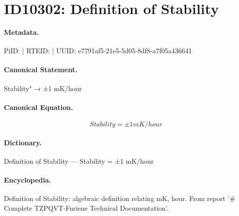\section*{ID10302: Definition of Stability}
\paragraph{Metadata.}
PiID:  | RTEID:  | UUID: e7791af5-21e5-5d05-8df8-a7f05a436641

\paragraph{Canonical Statement.}
Stability" → ±1 mK/hour

\paragraph{Canonical Equation.}
\[
Stability = ±1 mK/hour
\]

\paragraph{Dictionary.}
Definition of Stability — Stability = ±1 mK/hour

\paragraph{Encyclopedia.}
Definition of Stability: algebraic definition relating mK, hour. From report '\# Complete TZPQVT-Furiene Technical Documentation'.
